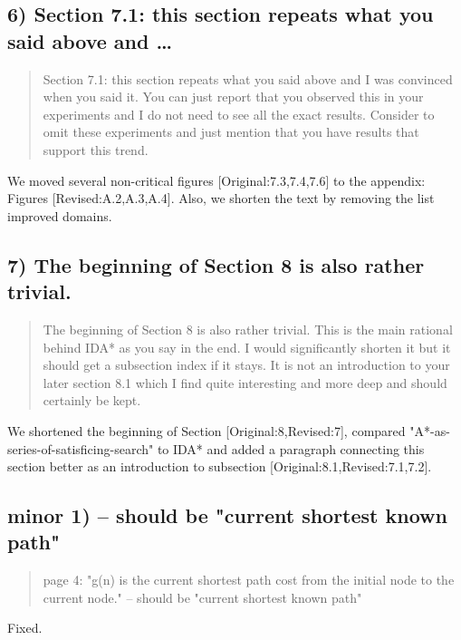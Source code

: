 \documentclass{article}
\begin{document}
\subsection{6) Section 7.1: this section repeats what you said above and \ldots{}}
\label{sec:orgheadline7}

\begin{quote}
Section 7.1: this section repeats what you said above and I was
convinced when you said it. You can just report that you observed this
in your experiments and I do not need to see all the exact results.
Consider to omit these experiments and just mention that you have
results that support this trend.
\end{quote}

We moved several non-critical figures [Original:7.3,7.4,7.6] to the appendix: Figures [Revised:A.2,A.3,A.4].
Also, we shorten the text by removing the list improved domains.

\subsection{7) The beginning of Section 8 is also rather trivial.}
\label{sec:orgheadline8}

\begin{quote}
The beginning of Section 8 is also rather trivial. This is the main
rational behind IDA* as you say in the end. I would significantly
shorten it but it should get a subsection index if it stays. It is not
an introduction to your later section 8.1 which I find quite
interesting and more deep and should certainly be kept.
\end{quote}

We shortened the beginning of Section [Original:8,Revised:7],
compared "A*-as-series-of-satisficing-search" to IDA*
and added a paragraph connecting this section
better as an introduction to subsection [Original:8.1,Revised:7.1,7.2].

\subsection{minor 1) -- should be "current shortest known path"}
\label{sec:orgheadline9}

\begin{quote}
page 4: "g(n) is the current shortest path cost from the initial node
to the current node." -- should be "current shortest known path"
\end{quote}

Fixed.
\end{document}
